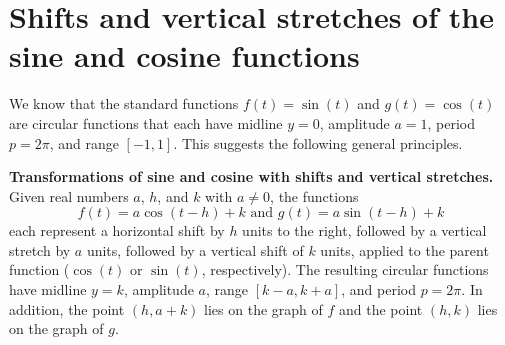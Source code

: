 \documentclass{ximera}
\begin{document}
%
%
%
\section{Shifts and vertical stretches of the sine and cosine functions}
We know that the standard functions \(f(t) = \sin(t)\) and \(g(t) = \cos(t)\) are circular functions that each have midline \(y = 0\), amplitude \(a = 1\), period \(p = 2\pi\), and range \([-1,1]\). This suggests the following general principles.%
\begin{callout}
\textbf{Transformations of sine and cosine with shifts and vertical stretches.}\\
Given real numbers \(a\), \(h\), and \(k\) with \(a \ne 0\), the functions%
\[
f(t) = a\cos(t-h)+k \text{ and } g(t) = a\sin(t-h) + k
\]
each represent a horizontal shift by \(h\) units to the right, followed by a vertical stretch by \(a\) units, followed by a vertical shift of \(k\) units, applied to the parent function (\(\cos(t)\) or \(\sin(t)\), respectively).  The resulting circular functions have midline \(y = k\), amplitude \(a\), range \([k-a,k+a]\), and period \(p = 2\pi\).  In addition, the point \((h,a+k)\) lies on the graph of \(f\) and the point \((h, k)\) lies on the graph of \(g\).%
\end{callout}
\end{document}
